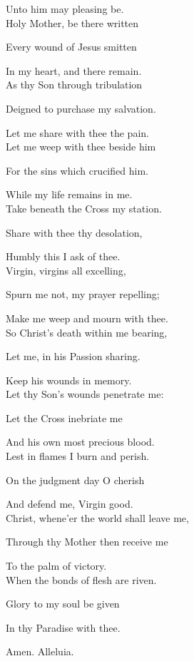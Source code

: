 \begin{multicols}{2}
Unto him may pleasing be.\\

Holy Mother, be there written

Every wound of Jesus smitten

In my heart, and there remain.\\

As thy Son through tribulation

Deigned to purchase my salvation.

Let me share with thee the pain.\\

Let me weep with thee beside him

For the sins which crucified him.

While my life remains in me.\\

Take beneath the Cross my station.

Share with thee thy desolation,

Humbly this I ask of thee.\\

Virgin, virgins all excelling,

Spurn me not, my prayer repelling;

Make me weep and mourn with thee.\\

So Christ's death within me bearing,

Let me, in his Passion sharing.

Keep his wounds in memory.\\

Let thy Son's wounds penetrate me:

Let the Cross inebriate me

And his own most precious blood.\\

Lest in flames I burn and perish.

On the judgment day O cherish

And defend me, Virgin good.\\

Christ, whene'er the world shall leave me,

Through thy Mother then receive me

To the palm of victory.\\

When the bonds of flesh are riven.

Glory to my soul be given

In thy Paradise with thee.

Amen. Alleluia.
\end{multicols}
